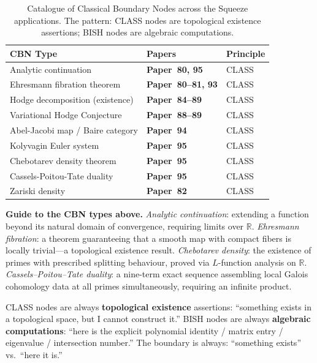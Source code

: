 \documentclass[11pt,twoside,openany]{report}
\theoremstyle{remark}
\newcommand{\BISH}{\textsf{BISH}}
\newcommand{\CLASS}{\textsf{CLASS}}
\newcommand{\paperref}[1]{\textbf{Paper~#1}}
\begin{document}
\begin{table}[htbp]
\centering\small
\caption{Catalogue of Classical Boundary Nodes across the Squeeze applications. The pattern: \CLASS{} nodes are topological existence assertions; \BISH{} nodes are algebraic computations.}
\label{tab:cbn-types}
\renewcommand{\arraystretch}{1.15}
\begin{tabular}{@{}l l l@{}}
\toprule
\textbf{CBN Type} & \textbf{Papers} & \textbf{Principle} \\
\midrule
\rowcolor{red!6}
Analytic continuation & \paperref{80, 95} & \CLASS \\
\rowcolor{red!6}
Ehresmann fibration theorem & \paperref{80--81, 93} & \CLASS \\
\rowcolor{red!6}
Hodge decomposition (existence) & \paperref{84--89} & \CLASS \\
\rowcolor{red!6}
Variational Hodge Conjecture & \paperref{88--89} & \CLASS \\
\rowcolor{red!6}
Abel-Jacobi map / Baire category & \paperref{94} & \CLASS \\
\rowcolor{red!6}
Kolyvagin Euler system & \paperref{95} & \CLASS \\
\rowcolor{red!6}
Chebotarev density theorem & \paperref{95} & \CLASS \\
\rowcolor{red!6}
Cassels-Poitou-Tate duality & \paperref{95} & \CLASS \\
\rowcolor{red!6}
Zariski density & \paperref{82} & \CLASS \\
\bottomrule
\end{tabular}
\end{table}

\textbf{Guide to the CBN types above.} \emph{Analytic continuation}: extending a function beyond its natural domain of convergence, requiring limits over $\mathbb{R}$. \emph{Ehresmann fibration}: a theorem guaranteeing that a smooth map with compact fibers is locally trivial---a topological existence result. \emph{Chebotarev density}: the existence of primes with prescribed splitting behaviour, proved via $L$-function analysis on $\mathbb{R}$. \emph{Cassels--Poitou--Tate duality}: a nine-term exact sequence assembling local Galois cohomology data at all primes simultaneously, requiring an infinite product.

\begin{thesisbox}
\CLASS{} nodes are always \textbf{topological existence} assertions: ``something exists in a topological space, but I cannot construct it.''
\BISH{} nodes are always \textbf{algebraic computations}: ``here is the explicit polynomial identity / matrix entry / eigenvalue / intersection number.''
The boundary is always: ``something exists'' vs.\ ``here it is.''
\end{thesisbox}
\end{document}
